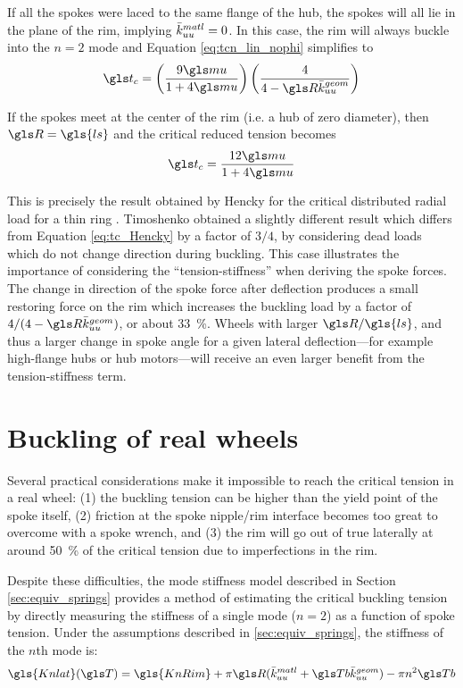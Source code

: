 \documentclass[\rootdir/thesis.tex]{subfiles}
\begin{document}
If all the spokes were laced to the same flange of the hub, the spokes will all lie in the plane of the rim, implying $\bar{k}_{uu}^{matl}=0$. In this case, the rim will always buckle into the $n=2$ mode and Equation \eqref{eq:tcn_lin_nophi} simplifies to
\begin{equation}
\ts_c = \left(\frac{9\m}{1 + 4\m}\right)\left(\frac{4}{4 - \R\geom{\kuu}}\right)
\end{equation}

If the spokes meet at the center of the rim (i.e. a hub of zero diameter), then $\R=\gls{ls}$ and the critical reduced tension becomes
\begin{equation}
\label{eq:tc_Hencky}
\ts_c = \frac{12\m}{1 + 4\m}
\end{equation}

This is precisely the result obtained by Hencky for the critical distributed radial load for a thin ring \cite{Timoshenko1961}. Timoshenko obtained a slightly different result which differs from Equation \eqref{eq:tc_Hencky} by a factor of  $3/4$, by considering dead loads which do not change direction during buckling. This case illustrates the importance of considering the ``tension-stiffness'' when deriving the spoke forces. The change in direction of the spoke force after deflection produces a small restoring force on the rim which increases the buckling load by a factor of $4/(4 - \R\geom{\kuu})$, or about \SI{33}{\percent}. Wheels with larger $\R/\gls{ls}$, and thus a larger change in spoke angle for a given lateral deflection---for example high-flange hubs or hub motors---will receive an even larger benefit from the tension-stiffness term.

\section{Buckling of real wheels}
\label{sec:K2_tension_buckling}

Several practical considerations make it impossible to reach the critical tension in a real wheel: (1) the buckling tension can be higher than the yield point of the spoke itself, (2) friction at the spoke nipple/rim interface becomes too great to overcome with a spoke wrench, and (3) the rim will go out of true laterally at around \SI{50}{\percent} of the critical tension due to imperfections in the rim.

Despite these difficulties, the mode stiffness model described in Section \ref{sec:equiv_springs} provides a method of estimating the critical buckling tension by directly measuring the stiffness of a single mode ($n=2$) as a function of spoke tension. Under the assumptions described in \ref{sec:equiv_springs}, the stiffness of the $n$th mode is:
\begin{equation}
\label{eq:Kn_buckling}
\gls{Knlat}(\T) = \gls{KnRim} + \pi \R (\matl{\kuu} + \Tb \geom{\kuu}) - \pi n^2 \Tb
\end{equation}
\end{document}
